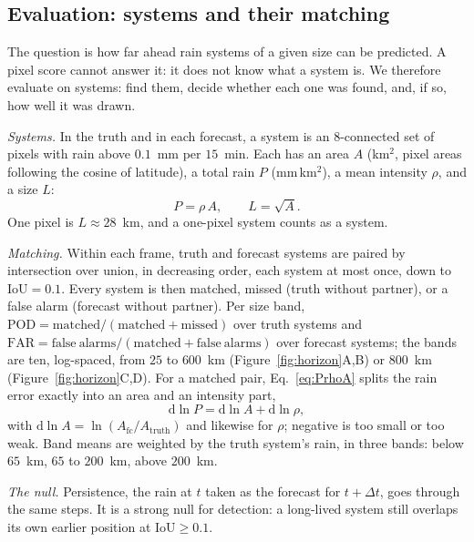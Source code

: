 \documentclass[draft]{agujournal2019}
\begin{document}
\subsection{Evaluation: systems and their matching}
\label{sec:evaluation}

The question is how far ahead rain systems of a given size can be
predicted. A pixel score cannot answer it: it does not know what a system
is. We therefore evaluate on systems: find them, decide whether each one
was found, and, if so, how well it was drawn.

\textit{Systems.} In the truth and in each forecast, a system is an
8-connected set of pixels with rain above $0.1$~mm per $15$~min. Each has
an area $A$ (km$^2$, pixel areas following the cosine of latitude), a
total rain $P$ (mm\,km$^2$), a mean intensity $\rho$, and a size $L$:
\begin{equation}
P = \rho\,A, \qquad L = \sqrt{A}.
\label{eq:PrhoA}
\end{equation}
One pixel is $L \approx 28$~km, and a one-pixel system counts as a system.

\textit{Matching.} Within each frame, truth and forecast systems are paired
by intersection over union, in decreasing order, each system at most once,
down to $\mathrm{IoU} = 0.1$. Every system is then matched, missed (truth
without partner), or a false alarm (forecast without partner). Per size
band, $\mathrm{POD} = \mathrm{matched}/(\mathrm{matched} + \mathrm{missed})$
over truth systems and $\mathrm{FAR} = \mathrm{false\ alarms}/(\mathrm{matched}
+ \mathrm{false\ alarms})$ over forecast systems; the bands are ten,
log-spaced, from $25$ to $600$~km (Figure~\ref{fig:horizon}A,B) or $800$~km
(Figure~\ref{fig:horizon}C,D). For a matched pair, Eq.~\ref{eq:PrhoA}
splits the rain error exactly into an area and an intensity part,
\begin{equation}
\mathrm{d}\ln P = \mathrm{d}\ln A + \mathrm{d}\ln\rho,
\label{eq:decomp}
\end{equation}
with $\mathrm{d}\ln A = \ln(A_{\mathrm{fc}}/A_{\mathrm{truth}})$ and
likewise for $\rho$; negative is too small or too weak. Band means are
weighted by the truth system's rain, in three bands: below $65$~km, $65$
to $200$~km, above $200$~km.

\textit{The null.} Persistence, the rain at $t$ taken as the forecast for
$t + \Delta t$, goes through the same steps. It is a strong null for
detection: a long-lived system still overlaps its own earlier position at
$\mathrm{IoU} \ge 0.1$.
\end{document}

